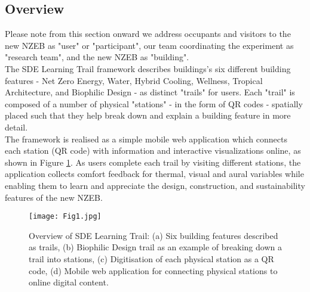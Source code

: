 

\subsection{Overview}

Please note from this section onward we address occupants and visitors to the new NZEB as "user" or "participant", our team coordinating the experiment as "research team", and the new NZEB as "building".\\ 

The SDE Learning Trail framework describes buildings's six different building features - Net Zero Energy, Water, Hybrid Cooling, Wellness, Tropical Architecture, and Biophilic Design - as distinct "trails" for users. Each "trail" is composed of a number of physical "stations" - in the form of QR codes - spatially placed such that they help break down and explain a building feature in more detail.\\

The framework is realised as a simple mobile web application which connects each station (QR code) with information and interactive visualizations online, as shown in Figure \ref{fig:framework}. As users complete each trail by visiting different stations, the application collects comfort feedback for thermal, visual and aural variables while enabling them to learn and appreciate the design, construction, and sustainability features of the new NZEB.\\

\begin{figure}
\begin{center}
\texttt{[image: Fig1.jpg]}
\caption{Overview of SDE Learning Trail: (a) Six building features described as trails, (b) Biophilic Design trail as an example of breaking down a trail into stations, (c) Digitisation of each physical station as a QR code, (d) Mobile web application for connecting physical stations to online digital content.}
\label{fig:framework}
\end{center}
\end{figure}  



